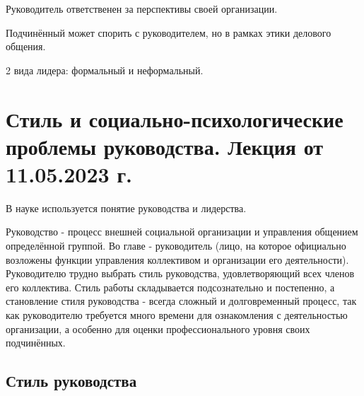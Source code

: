 Руководитель ответственен за перспективы своей организации.

Подчинённый может спорить с руководителем, но в рамках этики делового общения.

2 вида лидера: формальный и неформальный.

\section{Стиль и социально-психологические проблемы руководства. Лекция от 11.05.2023 г.}

В науке используется понятие руководства и лидерства.

Руководство - процесс внешней социальной организации и управления общением определённой группой. Во главе - руководитель (лицо, на которое официально возложены функции управления коллективом и организации его деятельности). Руководителю трудно выбрать стиль руководства, удовлетворяющий всех членов его коллектива. Стиль работы складывается подсознательно и постепенно, а становление стиля руководства - всегда сложный и долговременный процесс, так как руководителю требуется много времени для ознакомления с деятельностью организации, а особенно для оценки профессионального уровня своих подчинённых.

\subsection{Стиль руководства}

